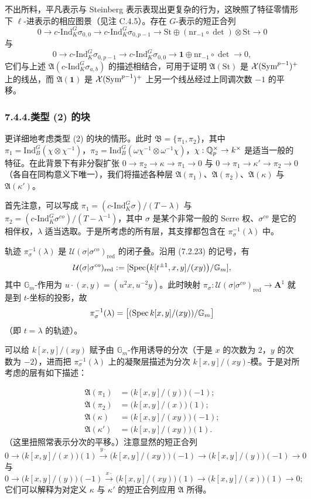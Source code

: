 不出所料，平凡表示与 Steinberg 表示表现出更复杂的行为，这映照了特征零情形下 $\ell$-进表示的相应图景（见注 C.4.5）。存在 $G$-表示的短正合列
\[
0\to c\text{-Ind}_K^G\sigma_{0,0}\to c\text{-Ind}_K^G\sigma_{0,p-1}\to\mathrm{St}\oplus(\mathrm{nr}_{-1}\circ\det)\otimes\mathrm{St}\to0
\]
与
\[
0\to c\text{-Ind}_K^G\sigma_{0,p-1}\to c\text{-Ind}_K^G\sigma_{0,0}\to\mathbf 1\oplus\mathrm{nr}_{-1}\circ\det\to0,
\]
它们与上述 $\mathfrak A(c\text{-Ind}_K^G\sigma_{a,b})$ 的描述相结合，可用于证明 $\mathfrak A(\mathrm{St})$ 是 $\mathcal{X}(\mathrm{Sym}^{p-1})^+$ 上的线丛，而 $\mathfrak A(\mathbf 1)$ 是 $\mathcal{X}(\mathrm{Sym}^{p-1})^+$ 上另一个线丛经过上同调次数 $-1$ 的平移。

\subsubsection*{7.4.4.\quad 类型 (2) 的块}
更详细地考虑类型 (2) 的块的情形。此时 $\mathfrak B=\{\pi_1,\pi_2\}$，其中 $\pi_1=\mathrm{Ind}_B^G(\chi\otimes\chi^{-1})$，$\pi_2=\mathrm{Ind}_B^G(\omega\chi^{-1}\otimes\omega^{-1}\chi)$，$\chi:\mathbb{Q}_p^\times\to k^\times$ 是适当一般的特征。在此背景下有非分裂扩张 $0\to\pi_2\to\kappa\to\pi_1\to0$ 与 $0\to\pi_1\to\kappa'\to\pi_2\to0$（各自在同构意义下唯一），我们将描述各种层 $\mathfrak A(\pi_1)$、$\mathfrak A(\pi_2)$、$\mathfrak A(\kappa)$ 与 $\mathfrak A(\kappa')$。

首先注意，可以写成 $\pi_1=(c\text{-Ind}_K^G\sigma)/(T-\lambda)$ 与 $\pi_2=(c\text{-Ind}_K^G\sigma^{co})/(T-\lambda^{-1})$，其中 $\sigma$ 是某个非常一般的 Serre 权、$\sigma^{co}$ 是它的相伴权，$\lambda$ 适当选取。于是所考虑的所有层，其支撑都包含在 $\pi_\sigma^{-1}(\lambda)$ 中。

轨迹 $\pi_\sigma^{-1}(\lambda)$ 是 $\mathcal U(\sigma|\sigma^{co})_{\mathrm{red}}$ 的闭子叠。沿用 (7.2.23) 的记号，有
\[
\mathcal U(\sigma|\sigma^{co})_{\mathrm{red}}:=[\operatorname{Spec}\bigl(k[t^{\pm1},x,y]/(xy)\bigr)/\mathbb G_m],
\]
其中 $\mathbb G_m$-作用为 $u\cdot(x,y)=(u^2x,u^{-2}y)$。此时映射 $\pi_\sigma:\mathcal U(\sigma|\sigma^{co})_{\mathrm{red}}\to\mathbf A^1$ 就是到 $t$-坐标的投影，故
\[
\pi_\sigma^{-1}(\lambda)=\bigl[(\operatorname{Spec} k[x,y]/(xy))/\mathbb G_m\bigr]
\]
（即 $t=\lambda$ 的轨迹）。

可以给 $k[x,y]/(xy)$ 赋予由 $\mathbb G_m$-作用诱导的分次（于是 $x$ 的次数为 $2$，$y$ 的次数为 $-2$），进而把 $\pi_\sigma^{-1}(\lambda)$ 上的凝聚层描述为分次 $k[x,y]/(xy)$-模。于是对所考虑的层有如下描述：

\[
\begin{aligned}
\mathfrak A(\pi_1)&=\bigl(k[x,y]/(y)\bigr)(-1);\\
\mathfrak A(\pi_2)&=\bigl(k[x,y]/(x)\bigr)(1);\\
\mathfrak A(\kappa)&=\bigl(k[x,y]/(xy)\bigr)(-1);\\
\mathfrak A(\kappa')&=\bigl(k[x,y]/(xy)\bigr)(1).
\end{aligned}
\]
（这里扭照常表示分次的平移。）注意显然的短正合列
\[
0\to\bigl(k[x,y]/(x)\bigr)(1)\xrightarrow{y\cdot}\bigl(k[x,y]/(xy)\bigr)(-1)\to\bigl(k[x,y]/(y)\bigr)(-1)\to0
\]
与
\[
0\to\bigl(k[x,y]/(y)\bigr)(-1)\xrightarrow{x\cdot}\bigl(k[x,y]/(xy)\bigr)(1)\to\bigl(k[x,y]/(x)\bigr)(1)\to0;
\]
它们可以解释为对定义 $\kappa$ 与 $\kappa'$ 的短正合列应用 $\mathfrak A$ 所得。

